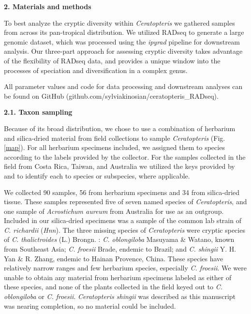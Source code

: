 \documentclass[12pt]{article}
\begin{document}
\begin{flushleft}
\vspace{1cm}

{\large\textbf{2. Materials and methods}}

To best analyze the cryptic diversity within \textit{Ceratopteris} we gathered samples from across its pan-tropical distribution. We utilized RADseq to generate a large genomic dataset, which was processed using the \textit{ipyrad} pipeline \autocite{Eaton2020} for downstream analysis. Our three-part approach for assessing cryptic diversity takes advantage of the flexibility of RADseq data, and provides a unique window into the processes of speciation and diversification in a complex genus. 

All parameter values and code for data processing and downstream analyses can be found on GitHub (github.com/sylviakinosian/ceratopteris\_RADseq).

\textbf{2.1. Taxon sampling}

Because of its broad distribution, we chose to use a combination of herbarium and silica-dried material from field collections to sample \textit{Ceratopteris} (Fig. \ref{map}). For all herbarium specimens included, we assigned them to species according to the labels provided by the collector. For the samples collected in the field from Costa Rica, Taiwan, and Australia we utilized the keys provided by \textcite{LloydTax1974} and \textcite{Masuyama2010} to identify each to species or subspecies, where applicable. 

We collected 90 samples, 56 from herbarium specimens and 34 from silica-dried tissue. These samples represented five of seven named species of \textit{Ceratopteris}, and one sample of \textit{Acrostichum aureum} from Australia for use as an outgroup. Included in our silica-dried specimens was a sample of the common lab strain of \textit{C. richardii} (\textit{Hnn}). The three missing species of \textit{Ceratopteris} were cryptic species of \textit{C. thalictroides} (L.) Brongn. \autocite{Masuyama2010}: \textit{C. oblongiloba} Masuyama \& Watano, known from Southeast Asia; \textit{C. froesii} Brade, endemic to Brazil; and \textit{C. shingii} Y. H. Yan & R. Zhang, endemic to Hainan Provence, China. These species have relatively narrow ranges and few herbarium species, especially \textit{C. froesii}. We were unable to obtain any material from herbarium specimens labeled as either of these species, and none of the plants collected in the field keyed out to \textit{C. oblongiloba} or \textit{C. froesii}. \textit{Ceratopteris shingii} was described as this manuscript was nearing completion, so no material could be included. 


\end{flushleft}
\end{document}
